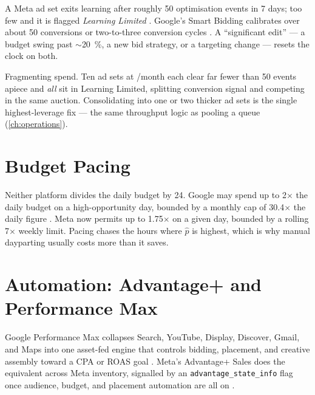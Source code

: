 \begin{platform}
A Meta ad set exits learning after roughly \num{50} optimisation events in \num{7} days; too few and it is flagged \emph{Learning Limited} \parencite{metadev-advantage-campaigns}. Google's Smart Bidding calibrates over about \num{50} conversions or two-to-three conversion cycles \parencite{gads13020501}. A ``significant edit'' --- a budget swing past \(\sim\)\qty{20}{\percent}, a new bid strategy, or a targeting change --- resets the clock on both.
\end{platform}

\begin{trap}
Fragmenting spend. Ten ad sets at /month each clear far fewer than 50 events apiece and \emph{all} sit in Learning Limited, splitting conversion signal and competing in the same auction. Consolidating into one or two thicker ad sets is the single highest-leverage fix --- the same throughput logic as pooling a queue (\cref{ch:operations}).
\end{trap}

\section{Budget Pacing}\label{sec:pacing}

\begin{platform}
Neither platform divides the daily budget by 24. Google may spend up to \num{2}$\times$ the daily budget on a high-opportunity day, bounded by a monthly cap of \num{30.4}$\times$ the daily figure \parencite{gads13685469,gads10486637}. Meta now permits up to \num{1.75}$\times$ on a given day, bounded by a rolling \num{7}$\times$ weekly limit. Pacing chases the hours where $\hat p$ is highest, which is why manual dayparting usually costs more than it saves.
\end{platform}

\section{Automation: Advantage+ and Performance Max}\label{sec:automation}

\begin{platform}
Google Performance Max collapses Search, YouTube, Display, Discover, Gmail, and Maps into one asset-fed engine that controls bidding, placement, and creative assembly toward a CPA or ROAS goal \parencite{gads10724817,gads10724896}. Meta's Advantage+ Sales does the equivalent across Meta inventory, signalled by an \texttt{advantage\_state\_info} flag once audience, budget, and placement automation are all on \parencite{metadev-advantage-plus-campaign-}.
\end{platform}

